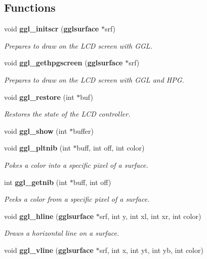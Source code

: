\subsection*{Functions}
\begin{CompactItemize}
\item 
void {\bf ggl\_\-initscr} ({\bf gglsurface} $\ast$srf)
\begin{CompactList}\small\item\em Prepares to draw on the LCD screen with GGL. \item\end{CompactList}\item 
void {\bf ggl\_\-gethpgscreen} ({\bf gglsurface} $\ast$srf)
\begin{CompactList}\small\item\em Prepares to draw on the LCD screen with GGL and HPG. \item\end{CompactList}\item 
void {\bf ggl\_\-restore} (int $\ast$buf)
\begin{CompactList}\small\item\em Restores the state of the LCD controller. \item\end{CompactList}\item 
void {\bf ggl\_\-show} (int $\ast$buffer)
\item 
void {\bf ggl\_\-pltnib} (int $\ast$buff, int off, int color)
\begin{CompactList}\small\item\em Pokes a color into a specific pixel of a surface. \item\end{CompactList}\item 
int {\bf ggl\_\-getnib} (int $\ast$buff, int off)
\begin{CompactList}\small\item\em Peeks a color from a specific pixel of a surface. \item\end{CompactList}\item 
void {\bf ggl\_\-hline} ({\bf gglsurface} $\ast$srf, int y, int xl, int xr, int color)
\begin{CompactList}\small\item\em Draws a horizontal line on a surface. \item\end{CompactList}\item 
void {\bf ggl\_\-vline} ({\bf gglsurface} $\ast$srf, int x, int yt, int yb, int color)

\end{CompactItemize}
